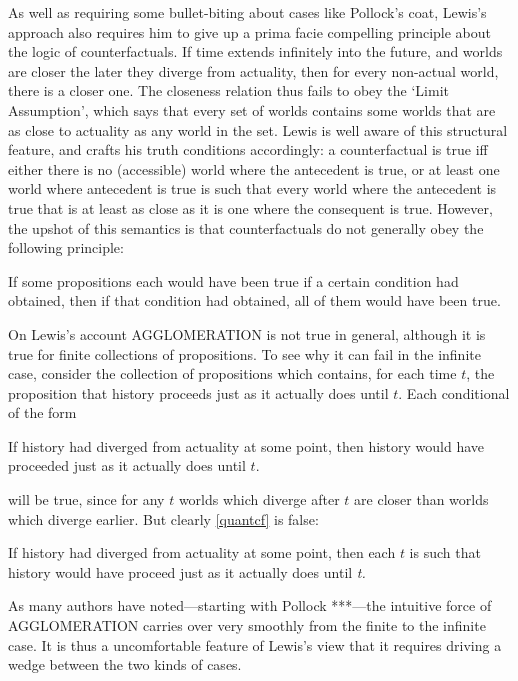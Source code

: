 \documentclass[If.tex]{subfiles}
\begin{document}
As well as requiring some bullet-biting about cases like Pollock's coat, Lewis's approach also requires him to give up a prima facie compelling principle about the logic of counterfactuals. If time extends infinitely into the future, and worlds are closer the later they diverge from actuality, then for every non-actual world, there is a closer one. The closeness relation thus fails to obey the ‘Limit Assumption’, which says that every set of worlds contains some worlds that are as close to actuality as any world in the set. Lewis is well aware of this structural feature, and crafts his truth conditions accordingly: a counterfactual is true iff either there is no (accessible) world where the antecedent is true, or at least one world where antecedent is true is such that every world where the antecedent is true that is at least as close as it is one where the consequent is true. However, the upshot of this semantics is that counterfactuals do not generally obey the following principle:
\begin{prop}  
	\litem[Agglomeration] \label{agglomeration}
	If some propositions each would have been true if a certain condition had obtained, then if that condition had obtained, all of them would have been true.
\end{prop}
On Lewis's account AGGLOMERATION is not true in general, although it is true for finite collections of propositions. To see why it can fail in the infinite case, consider the collection of propositions which contains, for each time $t$, the proposition that history proceeds just as it actually does until $t$. Each conditional of the form
\begin{prop}
	\nitem \label{cfquant}
		If history had diverged from actuality at some point, then history would have proceeded just as it actually does until $t$.
\end{prop}
will be true, since for any $t$ worlds which diverge after $t$ are closer than worlds which diverge earlier. But clearly \ref{quantcf} is false:
\begin{prop}
	\nitem \label{quantcf}
		If history had diverged from actuality at some point, then each $t$ is such that history would have proceed just as it actually does until \emph{t.}
\end{prop}
As many authors have noted---starting with Pollock ***---the intuitive force of AGGLOMERATION carries over very smoothly from the finite to the infinite case. It is thus a uncomfortable feature of Lewis's view that it requires driving a wedge between the two kinds of cases.
\end{document}
